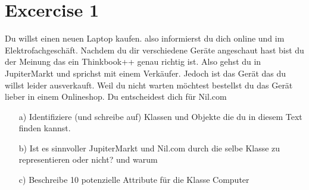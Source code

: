 
\section{Excercise 1}

Du willst einen neuen Laptop kaufen. also informierst du dich online und im Elektrofachgeschäft. Nachdem du dir verschiedene Geräte angeschaut hast bist du der Meinung das ein Thinkbook++ genau richtig ist. Also gehst du in JupiterMarkt und sprichst mit einem Verkäufer. Jedoch ist das Gerät das du willst leider ausverkauft. Weil du nicht warten möchtest bestellst du das Gerät lieber in einem Onlineshop. Du entscheidest dich für Nil.com

\begin{enumerate}
 \item[a)] Identifiziere (und schreibe auf) Klassen und Objekte die du in diesem Text finden kannst.
 \item[b)] Ist es sinnvoller JupiterMarkt und Nil.com durch die selbe Klasse zu representieren oder nicht? und warum
 \item[c)] Beschreibe 10 potenzielle Attribute für die Klasse Computer
\end{enumerate}
